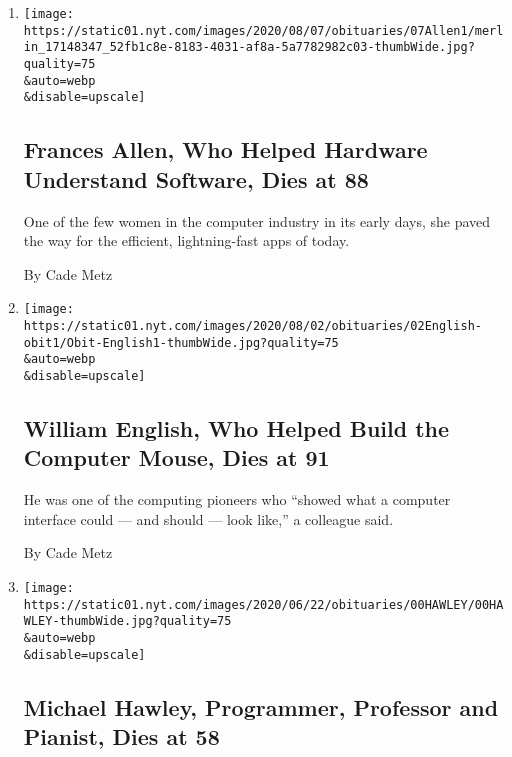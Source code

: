 \begin{enumerate}
\def\labelenumi{\arabic{enumi}.}
\item
  \href{/2020/08/08/technology/frances-allen-dead.html}{}

  \texttt{[image: https://static01.nyt.com/images/2020/08/07/obituaries/07Allen1/merlin\_17148347\_52fb1c8e-8183-4031-af8a-5a7782982c03-thumbWide.jpg?quality=75\\\&auto=webp\\\&disable=upscale]}

  \hypertarget{frances-allen-who-helped-hardware-understand-software-dies-at-88}{%
  \subsection{Frances Allen, Who Helped Hardware Understand Software,
  Dies at
  88}\label{frances-allen-who-helped-hardware-understand-software-dies-at-88}}

  One of the few women in the computer industry in its early days, she
  paved the way for the efficient, lightning-fast apps of today.

  By Cade Metz
\item
  \href{/2020/07/31/technology/william-english-who-helped-build-the-computer-mouse-dies-at-91.html}{}

  \texttt{[image: https://static01.nyt.com/images/2020/08/02/obituaries/02English-obit1/Obit-English1-thumbWide.jpg?quality=75\\\&auto=webp\\\&disable=upscale]}

  \hypertarget{william-english-who-helped-build-the-computer-mouse-dies-at-91}{%
  \subsection{William English, Who Helped Build the Computer Mouse, Dies
  at
  91}\label{william-english-who-helped-build-the-computer-mouse-dies-at-91}}

  He was one of the computing pioneers who ``showed what a computer
  interface could --- and should --- look like,'' a colleague said.

  By Cade Metz
\item
  \href{/2020/06/24/technology/michael-hawley-dead.html}{}

  \texttt{[image: https://static01.nyt.com/images/2020/06/22/obituaries/00HAWLEY/00HAWLEY-thumbWide.jpg?quality=75\\\&auto=webp\\\&disable=upscale]}

  \hypertarget{michael-hawley-programmer-professor-and-pianist-dies-at-58}{%
  \subsection{Michael Hawley, Programmer, Professor and Pianist, Dies at
  58}\label{michael-hawley-programmer-professor-and-pianist-dies-at-58}}


\end{enumerate}
